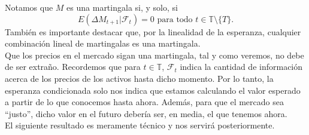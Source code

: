 Notamos que $ M $ es una martingala si, y solo, si
\[
E(\Delta M_{t+1} |\mathcal{F}_t ) = 0 \text{ para todo } t\in \mathbb{T}\setminus\{T\}.
\]
También es importante destacar que, por la linealidad de la esperanza, cualquier combinación lineal de martingalas es una martingala. \\

Que los precios en el mercado sigan una martingala, tal y como veremos, no debe de ser extraño. Recordemos que para $ t \in \mathbb{T} $, $ \mathcal{F}_t $ indica la cantidad de información acerca de los precios de los activos hasta dicho momento. Por lo tanto, la esperanza condicionada solo nos indica que estamos calculando el valor esperado a partir de lo que conocemos hasta ahora. Además, para que el mercado sea ``justo'', dicho valor en el futuro debería ser, en media, el que tenemos ahora. \\

El siguiente resultado es meramente técnico y nos servirá posteriormente. 

